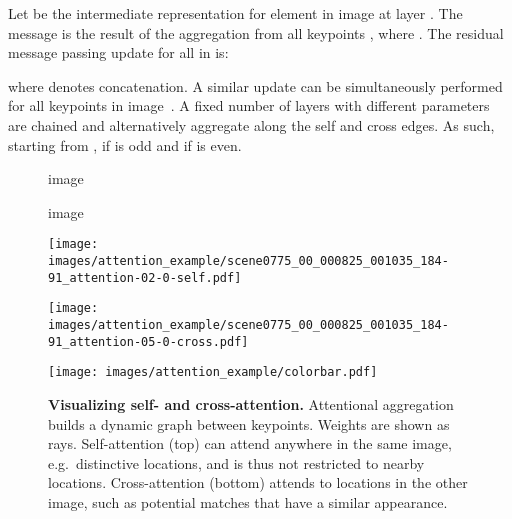 \documentclass[10pt,twocolumn,letterpaper]{article}
\renewcommand{\*}[1]{\mathbf{#1}}
\newcommand{\0}{\phantom{0}}
\begin{document}
Let  be the intermediate representation for element  in image  at layer . The message  is the result of the aggregation from all keypoints , where . The residual message passing update for all  in  is:
    
where  denotes concatenation.  A similar update can be simultaneously performed for all keypoints in image~. A fixed number of layers  with different parameters are chained and alternatively aggregate along the self and cross edges. As such, starting from ,  if  is odd and  if  is even.

\begin{figure}[!t]
\centering
\begin{minipage}{0.9\linewidth}
    \begin{minipage}{0.05\linewidth}
    \hfill
    \end{minipage}\begin{minipage}{0.475\linewidth}
    \centering
    \footnotesize{image }
    \end{minipage}\begin{minipage}{0.475\linewidth}
    \centering
    \footnotesize{image }
    \end{minipage}

    \begin{minipage}{0.05\linewidth}
    \end{minipage}\begin{minipage}{0.95\linewidth}
    \texttt{[image: images/attention\_example/scene0775\_00\_000825\_001035\_184-91\_attention-02-0-self.pdf]}\end{minipage}
    
    \vspace{1mm}
    \begin{minipage}{0.05\linewidth}
    \end{minipage}\begin{minipage}{0.95\linewidth}
    \texttt{[image: images/attention\_example/scene0775\_00\_000825\_001035\_184-91\_attention-05-0-cross.pdf]}\end{minipage}
\end{minipage}\hspace{1mm}
\begin{minipage}{0.05\linewidth}
\centering
    \centering
    \texttt{[image: images/attention\_example/colorbar.pdf]}\end{minipage}
\vspace{-1mm}
\caption{{\bf Visualizing self- and cross-attention.} Attentional aggregation builds a dynamic graph between keypoints. Weights  are shown as rays. Self-attention (top) can attend anywhere in the same image, e.g.\ distinctive locations, and is thus not restricted to nearby locations. Cross-attention (bottom) attends to locations in the other image, such as potential matches that have a similar appearance.
}\label{fig:attention}\vspace{-1mm}\end{figure}
\end{document}
